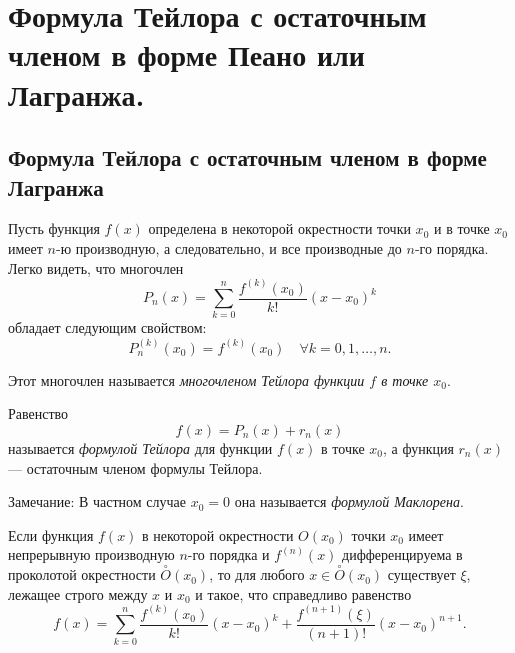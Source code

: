 \chapter{Формула Тейлора с остаточным членом в форме Пеано или Лагранжа.}

\section{Формула Тейлора с остаточным членом в форме Лагранжа}

Пусть функция $f(x)$ определена в некоторой окрестности точки $x_0$ и в точке $x_0$ имеет $n$-ю производную, а следовательно, и все производные до $n$-го порядка. Легко видеть, что многочлен
$$
P_n(x) = \sum_{k = 0}^{n} \frac{f^{(k)}(x_0)}{k!} (x - x_0)^k
$$
обладает следующим свойством:
$$
P_n^{(k)}(x_0) = f^{(k)}(x_0) \quad \forall k = 0,1,\ldots,n.
$$

Этот многочлен называется \textit{многочленом Тейлора функции $f$ в точке $x_0$}.

Равенство $$f(x) = P_n(x) + r_n(x)$$ называется \textit{формулой Тейлора} для функции $f(x)$ в точке $x_0$, а функция $r_n(x)$ --- остаточным членом формулы Тейлора.

Замечание: В частном случае $x_0=0$ она называется \textit{формулой Маклорена}.

\begin{thm}
Если функция $f(x)$ в некоторой окрестности $O(x_0)$ точки $x_0$ имеет непрерывную производную $n$-го порядка и $f^{(n)}(x)$ дифференцируема в проколотой окрестности $\overset{\circ}{O}(x_0)$, то для любого
$x \in \overset{\circ}{O}(x_0)$ существует $\xi$, лежащее строго между $x$ и $x_0$ и такое, что справедливо равенство
\begin{equation} \label{ch5.1eq1}
f(x) = \sum_{k = 0}^{n} \frac{f^{(k)}(x_0)}{k!}(x - x_0)^k + \frac{f^{(n + 1)}(\xi)}{(n + 1)!}(x - x_0)^{n + 1}.
\end{equation}
\end{thm}

